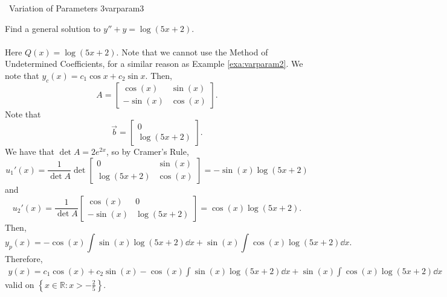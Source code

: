         \begin{example}{\Difficulty\,\Difficulty\,\,Variation of Parameters 3}{varparam3}

            Find a general solution to \(y''+y=\log(5x+2)\). 
            \\
            \\
            Here \(Q(x)=\log(5x+2)\). Note that we cannot use the Method of Undetermined Coefficients, for a similar reason as Example \ref{exa:varparam2}. We note that \(y_c(x)=c_1\cos x+c_2\sin x\). Then,
            \begin{equation*}
                A=\begin{bmatrix}
                    \cos(x) & \sin(x) \\
                    -\sin(x) & \cos(x)
                \end{bmatrix}.
            \end{equation*}
            Note that
            \begin{equation*}
                \vec{b}=\begin{bmatrix} 0 \\ \log(5x+2) \end{bmatrix}.
            \end{equation*}
            We have that \(\det A=2e^{2x}\), so by Cramer's Rule,
            \begin{equation*}
                u_1'(x)=\frac{1}{\det A}\det\begin{bmatrix}
                    0 & \sin(x) \\
                    \log(5x+2) & \cos(x)
                \end{bmatrix}=-\sin(x)\log(5x+2)
            \end{equation*}
            and
            \begin{equation*}
                u_2'(x)=\frac{1}{\det A}\begin{bmatrix}
                    \cos(x) & 0 \\
                    -\sin(x) & \log(5x+2)
                \end{bmatrix}=\cos(x)\log(5x+2).
            \end{equation*}
            Then,
            \begin{equation*}
                y_p(x)=-\cos(x)\int \sin(x)\log(5x+2)\dd x+\sin(x)\int \cos(x)\log(5x+2) \dd x.
            \end{equation*}
            Therefore,
            \begin{align*}
                y(x)=c_1\cos(x)+c_2\sin(x)-\cos(x)\int \sin(x)\log(5x+2)\dd x+\sin(x)\int \cos(x)\log(5x+2) \dd x
            \end{align*}
            valid on \(\left\{x\in\mathbb{R}:x>-\frac{2}{5}\right\}\).
            
        \end{example}

